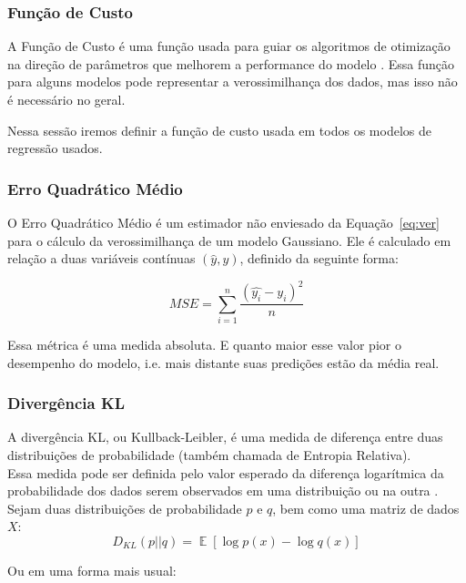 \subsubsection{Função de Custo}

A Função de Custo é uma função usada para guiar os algoritmos de otimização na
direção de parâmetros que melhorem a performance do modelo \citep{dlbook}.
Essa função para alguns modelos pode representar a verossimilhança dos dados,
mas isso não é necessário no geral.

Nessa sessão iremos definir a função de custo usada em todos os modelos de regressão usados. \\

\subsubsection{Erro Quadrático Médio}
\label{sec:MSE}

O Erro Quadrático Médio é um estimador não enviesado da Equação~\ref{eq:ver}
\citep{dlbook} para o cálculo da verossimilhança de um modelo Gaussiano. Ele é calculado em relação a duas variáveis contínuas
$(\hat{y},y)$, definido da seguinte forma:

\[MSE = \sum^n_{i=1}\frac{(\hat{y_i} - y_i)^2}{n}\]

Essa métrica é uma medida absoluta. E quanto maior esse valor pior o desempenho
do modelo, i.e. mais distante suas predições estão da média real. \\

\subsubsection{Divergência KL}

A divergência KL, ou Kullback-Leibler, é uma medida de diferença entre duas distribuições de probabilidade (também chamada de Entropia Relativa). \\
Essa medida pode ser definida pelo valor esperado da diferença logarítmica da probabilidade dos dados serem observados em uma distribuição ou na outra \citep{dlbook}. \\
Sejam duas distribuições de probabilidade $p$ e $q$, bem como uma matriz de dados $X$: \\

\[D_{KL}(p || q) = \mathop{\mathbb{E}}[\log p(x) - \log q(x)]​\]

Ou em uma forma mais usual: \\

